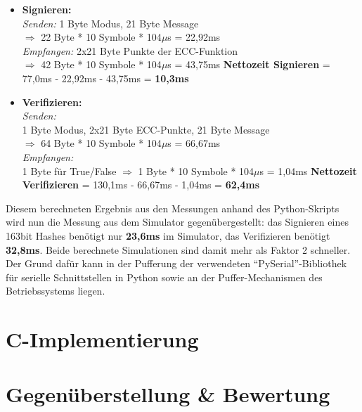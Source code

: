 \begin{itemize}
	\item \textbf{Signieren:}\\
\textit{Senden:} 
1 Byte Modus, 21 Byte Message\\
$\Rightarrow$ 22 Byte * 10 Symbole * 104$\mu$s = 22,92ms\\
\textit{Empfangen:} 
2x21 Byte Punkte der ECC-Funktion\\
$\Rightarrow$ 42 Byte  * 10 Symbole * 104$\mu$s = 43,75ms
\textbf{Nettozeit Signieren} = 77,0ms - 22,92ms - 43,75ms = \textbf{10,3ms}
	
	\item \textbf{Verifizieren:}\\
\textit{Senden:}\\
1 Byte Modus, 2x21 Byte ECC-Punkte, 21 Byte Message\\
$\Rightarrow$ 64 Byte * 10 Symbole * 104$\mu$s = 66,67ms\\
\textit{Empfangen:}\\
1 Byte für True/False
$\Rightarrow$ 1 Byte  * 10 Symbole * 104$\mu$s = 1,04ms
\textbf{Nettozeit Verifizieren} = 130,1ms - 66,67ms - 1,04ms = \textbf{62,4ms}\\
\end{itemize}

Diesem berechneten Ergebnis aus den Messungen anhand des Python-Skripts wird nun die Messung aus dem Simulator gegenübergestellt: das Signieren eines 163bit Hashes benötigt nur \textbf{23,6ms} im Simulator, das Verifizieren benötigt \textbf{32,8ms}. Beide berechnete Simulationen sind damit mehr als Faktor 2 schneller. Der Grund dafür kann in der Pufferung der verwendeten ``PySerial''-Bibliothek für serielle Schnittstellen in Python sowie an der Puffer-Mechanismen des Betriebssystems liegen. \\

\section{C-Implementierung}



\section{Gegenüberstellung \& Bewertung}



